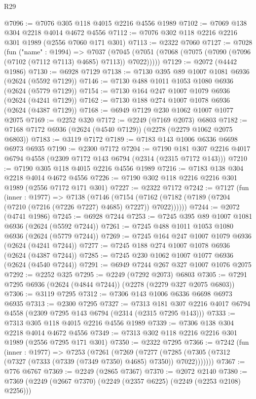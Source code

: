 \begin{lexlean}{R29}
\begin{coremodule}
@7096 := @7076 @305 @118 @4015 @2216 @4556 @1989
@7102 := @7069 @138 @304 @2218 @4014 @4672 @4556
@7112 := @7076 @302 @118 @2216 @2216 @301 @1989 (@2556 @7060 @171 @301)
@7113 := @2322 @7060
@7127 := @7028
    (fun ("name" : @1994) =>
    @7037 (@7045 (@7051 (@7068 (@7075 (@7090 (@7096 (@7102 (@7112 @7113) @4685) @7113)) @7022)))))
@7129 := @2072 (@4442 @1986)
@7130 := @6928 @7129
@7138 := @7130 @395 @89 @1007 @1081 @6936 (@2624 (@5592 @7129))
@7146 := @7130 @488 @1011 @1053 @1080 @6936 (@2624 (@5779 @7129))
@7154 := @7130 @164 @247 @1007 @1079 @6936 (@2624 (@4241 @7129))
@7162 := @7130 @188 @274 @1007 @1078 @6936 (@2624 (@4387 @7129))
@7168 := @6949 @7129 @230 @1062 @1007 @1077 @2075
@7169 := @2252 @320
@7172 := @2249 (@7169 @2073) @6803
@7182 := @7168 @7172 @6936 (@2624 (@4540 @7129)) (@2278 (@2279 @1062 @2075 @6803))
@7183 := @3119 @7172
@7189 := @7183 @143 @1006 @6336 @6698 @6973 @6935
@7190 := @2300 @7172
@7204 := @7190 @181 @307 @2216 @4017 @6794 @4558 (@2309 @7172 @143 @6794 (@2314 (@2315 @7172 @143)))
@7210 := @7190 @305 @118 @4015 @2216 @4556 @1989
@7216 := @7183 @138 @304 @2218 @4014 @4672 @4556
@7226 := @7190 @302 @118 @2216 @2216 @301 @1989 (@2556 @7172 @171 @301)
@7227 := @2322 @7172
@7242 := @7127
    (fun (inner : @1977) =>
    @7138
      (@7146
        (@7154 (@7162 (@7182 (@7189 (@7204 (@7210 (@7216 (@7226 @7227) @4685) @7227)) @7022))))))
@7244 := @2072 (@4741 @1986)
@7245 := @6928 @7244
@7253 := @7245 @395 @89 @1007 @1081 @6936 (@2624 (@5592 @7244))
@7261 := @7245 @488 @1011 @1053 @1080 @6936 (@2624 (@5779 @7244))
@7269 := @7245 @164 @247 @1007 @1079 @6936 (@2624 (@4241 @7244))
@7277 := @7245 @188 @274 @1007 @1078 @6936 (@2624 (@4387 @7244))
@7285 := @7245 @230 @1062 @1007 @1077 @6936 (@2624 (@4540 @7244))
@7291 := @6949 @7244 @267 @327 @1007 @1076 @2075
@7292 := @2252 @325
@7295 := @2249 (@7292 @2073) @6803
@7305 := @7291 @7295 @6936 (@2624 (@4844 @7244)) (@2278 (@2279 @327 @2075 @6803))
@7306 := @3119 @7295
@7312 := @7306 @143 @1006 @6336 @6698 @6973 @6935
@7313 := @2300 @7295
@7327 := @7313 @181 @307 @2216 @4017 @6794 @4558 (@2309 @7295 @143 @6794 (@2314 (@2315 @7295 @143)))
@7333 := @7313 @305 @118 @4015 @2216 @4556 @1989
@7339 := @7306 @138 @304 @2218 @4014 @4672 @4556
@7349 := @7313 @302 @118 @2216 @2216 @301 @1989 (@2556 @7295 @171 @301)
@7350 := @2322 @7295
@7366 := @7242
    (fun (inner : @1977) =>
    @7253
      (@7261
        (@7269
          (@7277 (@7285 (@7305 (@7312 (@7327 (@7333 (@7339 (@7349 @7350) @4685) @7350)) @7022)))))))
@7367 := @776 @6767
@7369 := @2249 (@2865 @7367)
@7370 := @2072 @2140
@7380 := @7369 (@2249 (@2667 @7370) (@2249 (@2357 @6225) (@2249 (@2253 @2108) @2256)))

\end{coremodule}
\end{lexlean}

